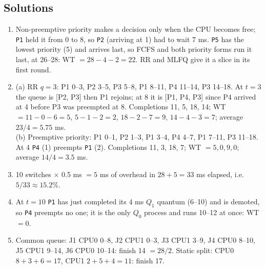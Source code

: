\documentclass[11pt]{article}
\begin{document}
\subsection*{Solutions}
\begingroup\small
\begin{enumerate}
  \item Non-preemptive priority makes a decision only when the CPU becomes free; \texttt{P1} held it from 0 to 8, so \texttt{P2} (arriving at 1) had to wait 7 ms. \texttt{P5} has the lowest priority (5) and arrives last, so FCFS and both priority forms run it last, at 26--28: WT $= 28-4-2 = 22$. RR and MLFQ give it a slice in its first round.
  \item (a) RR $q=3$: P1 0--3, P2 3--5, P3 5--8, P1 8--11, P4 11--14, P3 14--18. At $t=3$ the queue is [P2, P3] then P1 rejoins; at 8 it is [P1, P4, P3] since P4 arrived at 4 before P3 was preempted at 8. Completions 11, 5, 18, 14; WT $= 11-0-6 = 5$, $5-1-2 = 2$, $18-2-7 = 9$, $14-4-3 = 7$; average $23/4 = 5.75$ ms.\\
  (b) Preemptive priority: P1 0--1, P2 1--3, P1 3--4, P4 4--7, P1 7--11, P3 11--18. At 4 \texttt{P4} (1) preempts \texttt{P1} (2). Completions 11, 3, 18, 7; WT $= 5, 0, 9, 0$; average $14/4 = 3.5$ ms.
  \item 10 switches $\times$ 0.5 ms $= 5$ ms of overhead in $28 + 5 = 33$ ms elapsed, i.e.\ $5/33 \approx 15.2\%$.
  \item At $t=10$ \texttt{P1} has just completed its 4 ms $Q_1$ quantum (6--10) and is demoted, so \texttt{P4} preempts no one; it is the only $Q_0$ process and runs 10--12 at once: WT $= 0$.
  \item Common queue: J1 CPU0 0--8, J2 CPU1 0--3, J3 CPU1 3--9, J4 CPU0 8--10, J5 CPU1 9--14, J6 CPU0 10--14: finish 14 $= 28/2$. Static split: CPU0 $8+3+6 = 17$, CPU1 $2+5+4 = 11$: finish 17.
\end{enumerate}
\endgroup



\end{document}
